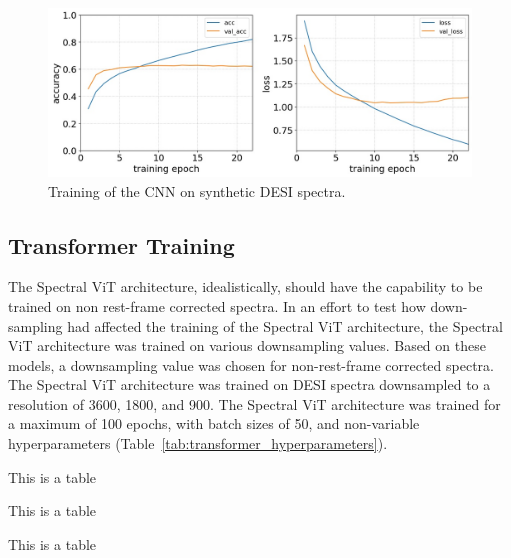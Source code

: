 \begin{figure}
    \centering
    \includegraphics[width=.7\linewidth]{figures/cnn/cnn_training_history.jpg}
    \caption{Training of the CNN on synthetic DESI spectra.}
    \label{fig:cnn_training}
\end{figure}

\subsection{Transformer Training}
\label{sec:transformer_training}
The Spectral ViT architecture, idealistically, should have the capability to be trained 
on non rest-frame corrected spectra. In an effort to test how down-sampling had 
affected the training of the Spectral ViT architecture, the Spectral ViT architecture
was trained on various downsampling values. Based on these models, a downsampling 
value was chosen for non-rest-frame corrected spectra. The Spectral ViT architecture 
was trained on DESI spectra downsampled to a resolution of 3600, 1800, and 900. 
The Spectral ViT architecture was trained for a maximum of 100 epochs, with 
batch sizes of 50, and non-variable hyperparameters (Table~\ref{tab:transformer_hyperparameters}).



\begin{table}[!ht]
\small
\centering
\sffamily

\caption{This is a table}
\label{tab:cnn_architecture}
\vspace{-5mm}
\end{table}

\begin{table}[!ht]
\small
\centering
\sffamily

\caption{This is a table}
\label{tab:cnn_hyperparameters}
\vspace{-5mm}
\end{table}

\begin{table}[!ht]
\small
\centering
\sffamily

\caption{This is a table}
\label{tab:transformer_hyperparameters}
\vspace{-5mm}
\end{table}



